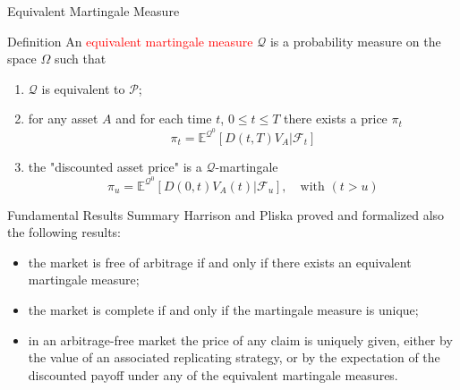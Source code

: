 \documentclass{beamer}
\begin{document}
\begin{frame}{Equivalent Martingale Measure}
  \begin{block}{Definition}
    An \textcolor{red}{equivalent martingale measure} $\mathcal{Q}$ is a probability measure on the space $\Omega$ such that
    \begin{enumerate}
    \item $\mathcal{Q}$ is equivalent to $\mathcal{P}$;
    \item for any asset $A$ and for each time $t$, $0\le t\le T$ there exists a price $\pi_t$
	\begin{equation*}
	  \pi_t = \mathbb{E}^{\mathcal{Q}^0}[D(t,T)V_A|\mathcal{F}_t]
	\end{equation*}
    \item the "discounted asset price" is a $\mathcal{Q}$-martingale
      \begin{equation*}
	\pi_u = \mathbb{E}^{\mathcal{Q}^0}[D(0,t)V_A(t)|\mathcal{F}_u], \quad\text{with }(t>u)
      \end{equation*}
    \end{enumerate}
  \end{block}
\end{frame}

\begin{frame}{Fundamental Results Summary}
  Harrison and Pliska proved and formalized also the following results:
  \begin{itemize}
  \item the market is free of arbitrage if and only if there exists an equivalent martingale measure;
  \item the market is complete if and only if the martingale measure is unique;
  \item in an arbitrage-free market the price of any claim is uniquely given, either by the value of an associated replicating strategy, or by the expectation of the discounted payoff under any of the equivalent martingale measures.
  \end{itemize}
\end{frame}
\end{document}
